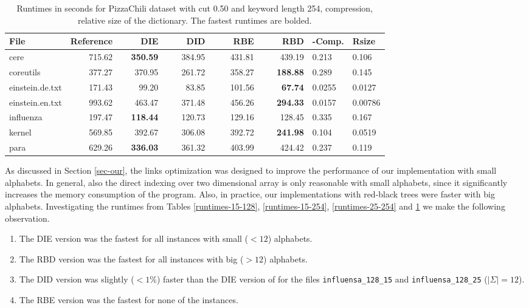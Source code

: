 \documentclass[english,twoside,censored,csm,algorithms-track-2020]{HYthesisML}
\theoremstyle{plain}
\theoremstyle{definition}
\begin{document}
\begin{center}
  \begin{table}
  \begin{tabular} {| l |r r r r r|l l|}
    \hline
    \textbf{File} & \textbf{Reference} & ~~~~\textbf{DIE} & ~~~~\textbf{DID} & ~~~~\textbf{RBE} & ~~~~\textbf{RBD} & \textbf{-Comp.} & \textbf{Rsize} \\
    \hline
    cere & 715.62 & \textbf{350.59} & 384.95 & 431.81 & 439.19            & 0.213  & 0.106   \\
    coreutils & 377.27 & 370.95 & 261.72 & 358.27 & \textbf{188.88}       & 0.289  & 0.145   \\
    einstein.de.txt & 171.43 & 99.20 & 83.85 & 101.56 & \textbf{67.74}    & 0.0255 & 0.0127  \\
    einstein.en.txt & 993.62 & 463.47 & 371.48 & 456.26 & \textbf{294.33} & 0.0157 & 0.00786 \\
    influenza & 197.47 & \textbf{118.44} & 120.73 & 129.16 & 128.45       & 0.335  & 0.167   \\
    kernel & 569.85 & 392.67 & 306.08 & 392.72 & \textbf{241.98}          & 0.104  & 0.0519  \\
    para & 629.26 & \textbf{336.03} & 361.32 & 403.99 & 424.42            & 0.237  & 0.119   \\
    \hline
  \end{tabular}
  \caption{Runtimes in seconds for PizzaChili dataset with cut 0.50 and keyword length 254, compression, relative size of the dictionary. The fastest runtimes are bolded.}
  \label{runtimes-50-254}
  \end{table}
\end{center}

As discussed in Section \ref{sec-our}, the links optimization was designed to improve the performance
of our implementation with small alphabets. In general, also the direct indexing over two
dimensional array is only reasonable with small alphabets, since it significantly increases
the memory consumption of the program. Also, in practice, our implementations with red-black trees
were faster with big alphabets. Investigating the runtimes from Tables \ref{runtimes-15-128},
\ref{runtimes-15-254}, \ref{runtimes-25-254} and \ref{runtimes-50-254} we make the following observation.

\begin{enumerate}
\item The DIE version was the fastest for all instances with small ($<12$) alphabets.
\item The RBD version was the fastest for all instances with big ($>12$) alphabets.
\item The DID version was slightly ($<1\%$) faster than the DIE version of for the files \texttt{influensa\_128\_15} and \texttt{influensa\_128\_25} ($|\Sigma| = 12$).
\item The RBE version was the fastest for none of the instances.
\end{enumerate}
\end{document}
